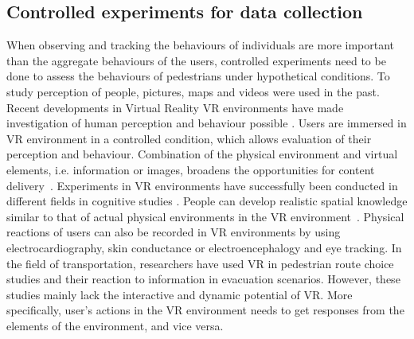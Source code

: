  \subsection{Controlled experiments for data collection}
 When observing and tracking the behaviours of individuals are more important than the aggregate behaviours of the users, controlled experiments need to be done to assess the behaviours of pedestrians under hypothetical conditions. To study perception of people, pictures, maps and videos were used in the past. Recent developments in Virtual Reality VR environments have made investigation of human perception and behaviour possible . Users are immersed in VR environment in a controlled condition, which allows evaluation of their perception and behaviour. Combination of the physical environment and virtual elements, i.e. information or images, broadens the opportunities for content delivery~\cite{farooq2018virtual,jennett2008measuring,animesh2011odyssey,nah2011enhancing,faiola2013correlating}. Experiments in VR environments have successfully been conducted in different fields in cognitive studies \cite{farooq2018virtual}. People can develop realistic spatial knowledge similar to that of actual physical environments in the VR environment~\cite{o1992effects,ruddle1997navigating}. Physical reactions of users can also be recorded in VR environments by using electrocardiography, skin conductance or electroencephalogy and eye tracking. In the field of transportation, researchers have used VR in pedestrian route choice studies and their reaction to information in evacuation scenarios. However, these studies mainly lack the interactive and dynamic potential of VR. More specifically, user's actions in the VR environment needs to get responses from the elements of the environment, and vice versa. 

